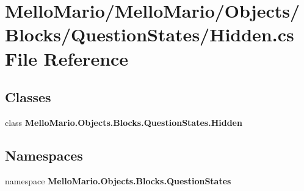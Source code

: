 \section{Mello\+Mario/\+Mello\+Mario/\+Objects/\+Blocks/\+Question\+States/\+Hidden.cs File Reference}
\label{Blocks_2QuestionStates_2Hidden_8cs}
\subsection*{Classes}
\begin{DoxyCompactItemize}
\item 
class \textbf{ Mello\+Mario.\+Objects.\+Blocks.\+Question\+States.\+Hidden}
\end{DoxyCompactItemize}
\subsection*{Namespaces}
\begin{DoxyCompactItemize}
\item 
namespace \textbf{ Mello\+Mario.\+Objects.\+Blocks.\+Question\+States}
\end{DoxyCompactItemize}
